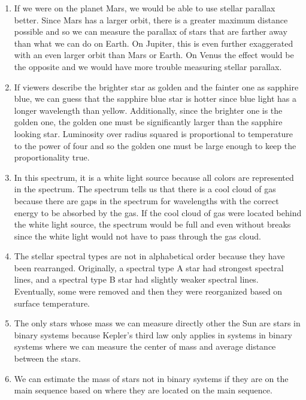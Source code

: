 \documentclass[../hw2.tex]{subfiles}
\begin{document}
    \begin{enumerate}
        \item If we were on the planet Mars, we would be able to use stellar parallax better. Since Mars has a larger orbit, there is a greater maximum distance possible and so we can measure the parallax of stars that are farther away than what we can do on Earth. On Jupiter, this is even further exaggerated with an even larger orbit than Mars or Earth. On Venus the effect would be the opposite and we would have more trouble measuring stellar parallax. 
        \item If viewers describe the brighter star as golden and the fainter one as sapphire blue, we can guess that the sapphire blue star is hotter since blue light has a longer wavelength than yellow. Additionally, since the brighter one is the golden one, the golden one must be significantly larger than the sapphire looking star. Luminosity over radius squared is proportional to temperature to the power of four and so the golden one must be large enough to keep the proportionality true.
        \item In this spectrum, it is a white light source because all colors are represented in the spectrum. The spectrum tells us that there is a cool cloud of gas because there are gaps in the spectrum for wavelengths with the correct energy to be absorbed by the gas. If the cool cloud of gas were located behind the white light source, the spectrum would be full and even without breaks since the white light would not have to pass through the gas cloud.
        \item The stellar spectral types are not in alphabetical order because they have been rearranged. Originally, a spectral type A star had strongest spectral lines, and a spectral type B star had slightly weaker spectral lines. Eventually, some were removed and then they were reorganized based on surface temperature.
        \item The only stars whose mass we can measure directly other the Sun are stars in binary systems because Kepler's third law only applies in systems in binary systems where we can measure the center of mass and average distance between the stars. 
        \item We can estimate the mass of stars not in binary systems if they are on the main sequence based on where they are located on the main sequence.
    \end{enumerate}
\end{document}
